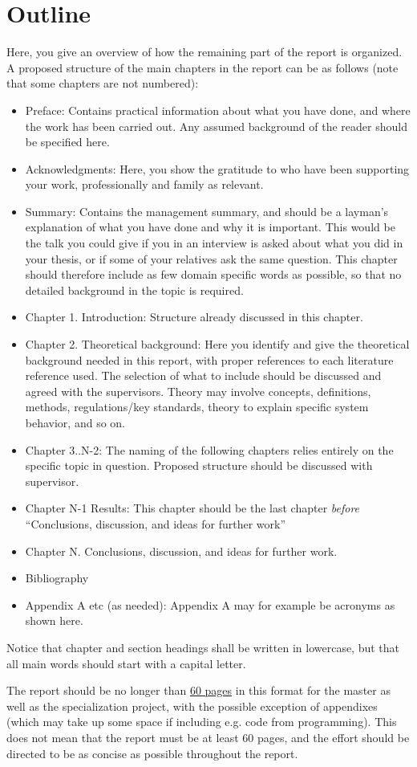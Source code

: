 \section{Outline}
Here, you give an overview of how the remaining part of the report is organized. A proposed structure of the main chapters in the report can be as follows (note that some chapters are not numbered):
\begin{itemize}
\item Preface: Contains practical information about what you have done, and where the work has been carried out. Any assumed background of the reader should be specified here.
\item Acknowledgments: Here, you show the gratitude to who have been supporting your work, professionally and family as relevant.
\item Summary: Contains the management summary, and should be a layman's explanation of what you have done and why it is important. This would be the talk you could give if you in an  interview is asked about what you did in your thesis, or if some of your relatives ask the same question. This chapter should therefore include as few domain specific words as possible, so that no detailed background in the topic is required. 
\item Chapter 1. Introduction: Structure already discussed in this chapter.
\item Chapter 2. Theoretical background: Here you identify and give the theoretical background needed in this report, with proper references to each literature reference used. The selection of what to include should be discussed and agreed with the supervisors. Theory may involve concepts, definitions, methods, regulations/key standards, theory to explain specific system behavior, and so on.
\item Chapter 3..N-2: The naming of the following chapters relies entirely on the specific topic in question. Proposed structure should be discussed with supervisor.
\item Chapter N-1 Results: This chapter should be the last chapter \textit{before} ``Conclusions, discussion, and ideas for further work''
\item Chapter N. Conclusions, discussion, and ideas for further work.
\item Bibliography
\item Appendix A etc (as needed): Appendix A may for example be acronyms as shown here.
\end{itemize}



\begin{remark}
Notice that chapter and section headings shall be written in lowercase, but that all main words should start with a capital letter.
\end{remark}



The report should be no longer than \underline{60 pages} in this format for the master as well as the specialization project, with the possible exception of appendixes (which may take up some space if including e.g. code from programming). This does not mean that the report must be at least 60 pages, and the effort should be directed to be as concise as possible throughout the report.